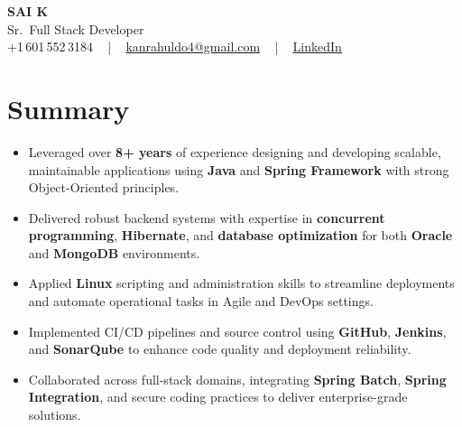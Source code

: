 \documentclass[letterpaper,11pt]{article}
\newcommand{\resumeItem}[1]{
  \item\footnotesize{
    {#1 \vspace{-2pt}}
  }
}
\newcommand{\resumeItemListStart}{\begin{itemize}[leftmargin=*]}
\newcommand{\resumeItemListEnd}{\end{itemize}\vspace{-5pt}}
\begin{document}
\begin{center}
    {\fontsize{14pt}{12pt}\selectfont \textbf{\MakeUppercase{Sai K}}}\\ \vspace{2pt}
    \fontsize{10pt}{12pt}\selectfont Sr.\ Full Stack Developer\\ \vspace{2pt}
    \fontsize{10pt}{12pt}\selectfont +1\,601\,552\,3184 ~ | ~
    \href{mailto:kanrahuldo4@gmail.com}{kanrahuldo4@gmail.com} ~ | ~
    \href{https://www.linkedin.com/in/srrrk/}{\color{blue}\underline{LinkedIn}}
    \vspace{-10pt}
\end{center}

\section{Summary}
\fontsize{9pt}{10pt}\selectfont
\resumeItemListStart
  \resumeItem{Leveraged over \textbf{8+ years} of experience designing and developing scalable, maintainable applications using \textbf{Java} and \textbf{Spring Framework} with strong Object-Oriented principles.}
  \resumeItem{Delivered robust backend systems with expertise in \textbf{concurrent programming}, \textbf{Hibernate}, and \textbf{database optimization} for both \textbf{Oracle} and \textbf{MongoDB} environments.}
  \resumeItem{Applied \textbf{Linux} scripting and administration skills to streamline deployments and automate operational tasks in Agile and DevOps settings.}
  \resumeItem{Implemented CI/CD pipelines and source control using \textbf{GitHub}, \textbf{Jenkins}, and \textbf{SonarQube} to enhance code quality and deployment reliability.}
  \resumeItem{Collaborated across full-stack domains, integrating \textbf{Spring Batch}, \textbf{Spring Integration}, and secure coding practices to deliver enterprise-grade solutions.}
\resumeItemListEnd
\vspace{-6pt}

\end{document}
